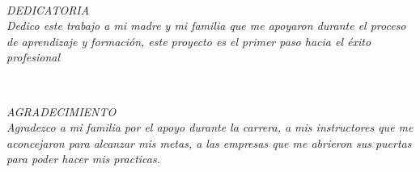 \documentclass[stu, 12pt, letterpaper, donotrepeattitle, floatsintext, natbib]{apa7}
\begin{document}
\newpage
\begin{justify}
	\begin{flushright}
		\textit{ } \\
		\begin{minipage}{0.6\textwidth} %

			\textit{DEDICATORIA} \\
			\textit{Dedico este trabajo a mi madre y mi familia que me apoyaron durante el proceso de aprendizaje y formación, este proyecto es el primer paso hacia el éxito profesional}
		\end{minipage}
	\end{flushright}
\end{justify}
\newpage
\begin{justify}
	\begin{flushright}
		\textit{ } \\
		\begin{minipage}{0.6\textwidth} %

			\textit{AGRADECIMIENTO} \\
			\textit{Agradezco a mi familia por el apoyo durante la carrera, a mis instructores que me aconcejaron para alcanzar mis metas, a las empresas que me abrieron sus puertas para poder hacer mis practicas.}
		\end{minipage}
	\end{flushright}
\end{justify}



\newpage

\newpage
\renewcommand{\contentsname}{Índice de contenido}
\tableofcontents
\setcounter{tocdepth}{1}



\renewcommand{\listfigurename}{Índice de diagramas}
\newpage
\listoffigures

\renewcommand{\listtablename}{Índice de tablas}
\newpage
\listoftables



\newpage
{}
\end{document}
